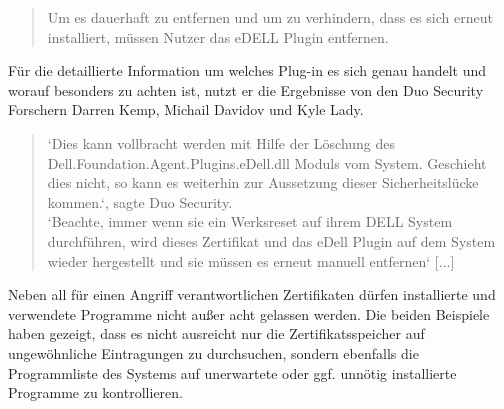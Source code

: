\begin{quote}
	\glqq Um es dauerhaft zu entfernen und um zu verhindern, dass es sich erneut installiert, müssen Nutzer das eDELL Plugin entfernen.\grqq \cite{zdnet}
\end{quote}
Für die detaillierte Information um welches Plug-in es sich genau handelt und worauf besonders zu achten ist, nutzt er die Ergebnisse von den Duo Security Forschern Darren Kemp, Michail Davidov und Kyle Lady.
\begin{quote}
	\glqq‘Dies kann vollbracht werden mit Hilfe der Löschung des \newline Dell.Foundation.Agent.Plugins.eDell.dll Moduls vom System. Geschieht dies nicht, so kann es weiterhin zur Aussetzung dieser Sicherheitslücke kommen.‘, sagte Duo Security.
	\\
	‘Beachte, immer wenn sie ein Werksreset auf ihrem DELL System durchführen, wird dieses Zertifikat und das eDell Plugin auf dem System wieder hergestellt und sie müssen es erneut manuell entfernen‘ [...]\grqq \cite{zdnet}
\end{quote}
Neben all für einen Angriff verantwortlichen Zertifikaten dürfen installierte und verwendete Programme nicht außer acht gelassen werden. Die beiden Beispiele haben gezeigt, dass es nicht ausreicht nur die Zertifikatsspeicher auf ungewöhnliche Eintragungen zu durchsuchen, sondern ebenfalls die Programmliste des Systems auf unerwartete oder ggf. unnötig installierte Programme zu kontrollieren.
